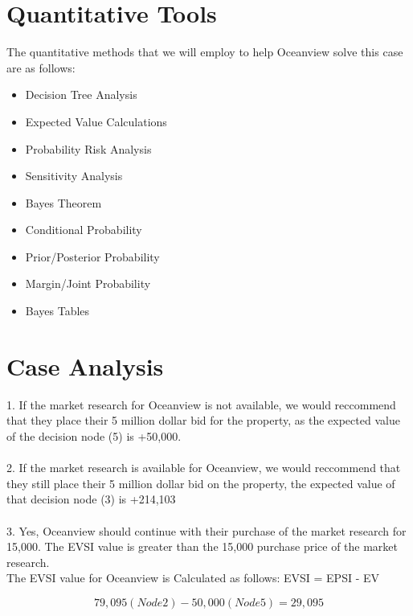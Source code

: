 \documentclass{article}
\begin{document}
\section*{Quantitative Tools}

The quantitative methods that we will employ to help Oceanview solve this case are as follows:

\begin{itemize}
    \item Decision Tree Analysis
    \item Expected Value Calculations
    \item Probability Risk Analysis
    \item Sensitivity Analysis
    \item Bayes Theorem
     \item Conditional Probability
     \item Prior/Posterior Probability
     \item Margin/Joint Probability
     \item Bayes Tables
\end{itemize}


\section{Case Analysis}
1. If the market research for Oceanview is not available, we would reccommend that they place their 5 million dollar bid for the property, as the expected value of the decision node (5) is +50,000. \\ \\
2. If the market research is available for Oceanview, we would reccommend that they still place their 5 million dollar bid on the property, the expected value of that decision node (3) is +214,103 \\ \\
3. Yes, Oceanview should continue with their purchase of the market research for 15,000. The EVSI value is greater than the 15,000 purchase price of the market research.\\
The EVSI value for Oceanview is Calculated as follows: EVSI = EPSI - EV

\[ 
79,095 (Node 2) - 50,000 (Node 5) = 29,095
\]
 \\ \\  \\ \\ \\ \\  \\  \\  \\ \\
\end{document}

